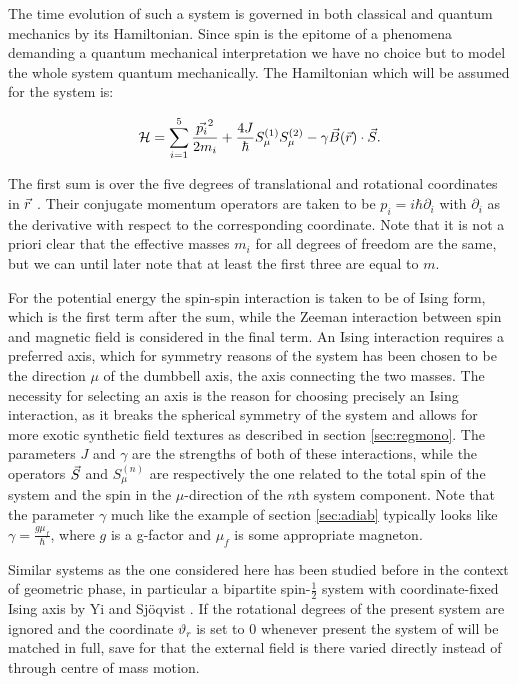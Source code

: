 \documentclass[a4paper]{article}
\begin{document}
The time evolution of such a system is governed in both classical and quantum mechanics by
its Hamiltonian. Since spin is the epitome of a phenomena demanding a quantum mechanical
interpretation we have no choice but to model the whole system quantum mechanically. %
The Hamiltonian which will be assumed for the system is:

\begin{equation}\label{eq:Hamil0}
        \mathbb{\cal H} = \sum_{i=1}^{5} \frac{\vec{p_i}^2}{2m_i} +
        \frac{4J}{\hbar{}}S^{(1)}_{\mu}S^{(2)}_{\mu} -
        \gamma\vec{B}(\vec{r})\cdot \vec{S}.
\end{equation}

The first sum is over the five degrees of translational and rotational coordinates in \(\vec{r}\)
. Their conjugate momentum operators are
taken to be \(p_i = i\hbar \partial_i\label{def:mom}\) with \(\partial_i\) as the derivative with respect
to the
corresponding coordinate. Note that it is not a priori clear that the effective masses
\(m_i\) for
all degrees of freedom are the same, but we can until later note that at least the first
three are equal to \(m\).

For the potential energy the spin-spin interaction is taken to be of Ising form, which is
the first term after the sum, while the Zeeman interaction between spin and magnetic field is
considered in the final term. %
An Ising interaction requires a preferred axis, which for symmetry reasons
of the system has been chosen to be the direction \(\mu\) of the dumbbell axis, the axis connecting
the two masses. The necessity for selecting an axis is the reason for choosing
precisely an Ising interaction, as it breaks the spherical symmetry of the system and
allows for more exotic synthetic field textures as described in section \ref{sec:regmono}. The parameters \(J\) and \(\gamma\) are the strengths of both
of these interactions, while the operators \(\vec{S}\) and \(S^{(n)}_{\mu}\) are respectively
the one
related to the total spin of the system and the spin in the \(\mu\)-direction of the \(n\)th system
component. Note that the parameter \(\gamma\) much like the example of section
\ref{sec:adiab} typically looks like \(\gamma = \frac{g\mu_f}{\hbar{}}\), where \(g\) is a
g-factor and \(\mu _f\) is some appropriate magneton.

Similar systems as the one considered here has been studied before in the context of geometric phase, in particular
a bipartite spin-\(\frac{1}{2}\) system with coordinate-fixed Ising axis by Yi and Sjöqvist
\cite{yi}. If the rotational degrees of the present system are ignored and the coordinate
\(\vartheta_r\) is set to \(0\) whenever present the system of \cite{yi} will be
matched in full, save for that the external field is there varied directly instead of
through centre of mass motion.
\end{document}
